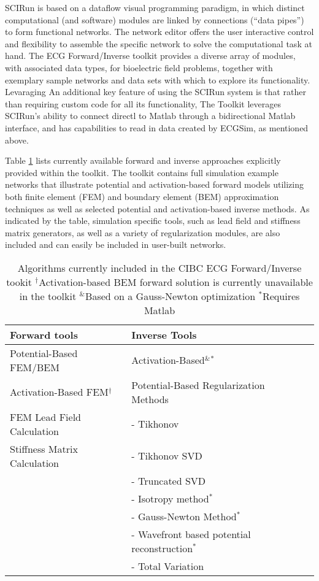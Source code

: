 SCIRun is based on a dataflow visual programming paradigm, in which distinct
computational (and software) modules are linked by connections (``data
pipes'') to form functional networks.  The network editor offers the user
interactive control and flexibility to assemble the specific network to
solve the computational task at hand. 
The ECG Forward/Inverse toolkit provides
a diverse array of modules, with associated data types, for bioelectric field problems,
together with exemplary sample networks and data sets with which to explore its
functionality.  Levaraging
An additional key feature of using the SCIRun system is
that rather than requiring custom code for all its functionality, The
Toolkit leverages SCIRun's ability to
connect directl to Matlab through a 
bidirectional Matlab interface, and has capabilities to read in data
created by ECGSim, as mentioned above.

Table \ref{tab:prop} lists currently available forward and inverse
approaches explicitly provided within the toolkit.  The toolkit contains
full simulation example networks that illustrate potential and
activation-based forward models utilizing both finite element (FEM) and boundary
element (BEM) approximation techniques as well as selected potential and
activation-based inverse methods.  As indicated by the table,
simulation specific tools, such as lead field and stiffness matrix
generators, as well as a variety of regularization modules, are also
included and can easily be included in user-built networks.

\begin{table}[b!]
\begin{tabular}{|ll|l|}
\hline
{\bf Forward tools} & {\bf Inverse Tools}\\ \hline
\hline
Potential-Based FEM/BEM & Activation-Based$^{\&}$$^{*}$\\ \hline
Activation-Based FEM$^{\dag}$ & Potential-Based Regularization  Methods\\ \hline
FEM Lead Field Calculation &   -  Tikhonov  \\ \hline
Stiffness Matrix Calculation &- Tikhonov SVD  \\ \hline
 & - Truncated SVD\\ \hline
& - Isotropy method$^{*}$\\ \hline
 & - Gauss-Newton Method$^{*}$\\ \hline
 & - Wavefront based potential reconstruction$^*$\\ \hline
 & - Total Variation \\ \hline
\end{tabular}
\caption{Algorithms currently included in the CIBC ECG Forward/Inverse
tookit \newline
$^\dag$Activation-based BEM forward solution is currently
unavailable in the toolkit \newline
$^{\&}$Based on a Gauss-Newton optimization \newline
$^{*}$Requires Matlab
}
\label{tab:prop}
\end{table}

